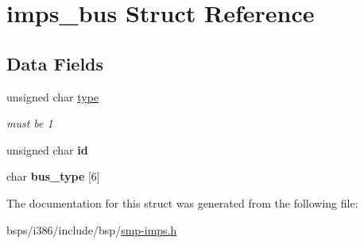 \hypertarget{structimps__bus}{}\section{imps\+\_\+bus Struct Reference}
\label{structimps__bus}
\subsection*{Data Fields}
\begin{DoxyCompactItemize}
\item 
\mbox{\label{structimps__bus_ae7ff7cf0ed6ae5e3f9f2696044744d81}} 
unsigned char \mbox{\hyperlink{structimps__bus_ae7ff7cf0ed6ae5e3f9f2696044744d81}{type}}
\begin{DoxyCompactList}\small\item\em must be 1 \end{DoxyCompactList}\item 
\mbox{\label{structimps__bus_a7859b8eacd67034936a4854071df8024}} 
unsigned char {\bfseries id}
\item 
\mbox{\label{structimps__bus_a82029015bf79f1e5ae47e22a3e93833e}} 
char {\bfseries bus\+\_\+type} \mbox{[}6\mbox{]}
\end{DoxyCompactItemize}


The documentation for this struct was generated from the following file\+:\begin{DoxyCompactItemize}
\item 
bsps/i386/include/bsp/\mbox{\hyperlink{smp-imps_8h}{smp-\/imps.\+h}}\end{DoxyCompactItemize}
